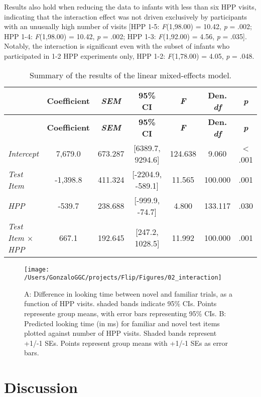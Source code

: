 \documentclass[english,man,man,floatsintext]{apa6}
\begin{document}
Results also hold when reducing the data to infants with less than six HPP visits, indicating that the interaction effect was not driven exclusively by participants with an unusually high number of visits {[}HPP 1-5: \emph{F}(1,98.00) = 10.42, \emph{p} = .002; HPP 1-4: \emph{F}(1,98.00) = 10.42, \emph{p} = .002; HPP 1-3: \emph{F}(1,92.00) = 4.56, \emph{p} = .035{]}. Notably, the interaction is significant even with the subset of infants who participated in 1-2 HPP experiments only, HPP 1-2: \emph{F}(1,78.00) = 4.05, \emph{p} = .048.

\begin{longtable}[]{@{}lcccccc@{}}
\caption{\label{tab:tab1}Summary of the results of the linear mixed-effects model.}\tabularnewline
\toprule
& \textbf{Coefficient} & \textbf{\emph{SEM}} & \textbf{95\% CI} & \textbf{\emph{F}} & \textbf{Den. \emph{df}} & \textbf{\emph{p}}\tabularnewline
\midrule
\endfirsthead
\toprule
& \textbf{Coefficient} & \textbf{\emph{SEM}} & \textbf{95\% CI} & \textbf{\emph{F}} & \textbf{Den. \emph{df}} & \textbf{\emph{p}}\tabularnewline
\midrule
\endhead
\emph{Intercept} & 7,679.0 & 673.287 & {[}6389.7, 9294.6{]} & 124.638 & 9.060 & \textless{} .001\tabularnewline
\emph{Test Item} & -1,398.8 & 411.324 & {[}-2204.9, -589.1{]} & 11.565 & 100.000 & .001\tabularnewline
\emph{HPP} & -539.7 & 238.688 & {[}-999.9, -74.7{]} & 4.800 & 133.117 & .030\tabularnewline
\emph{Test Item \(\times\) HPP} & 667.1 & 192.645 & {[}247.2, 1028.5{]} & 11.992 & 100.000 & .001\tabularnewline
\bottomrule
\end{longtable}

\begin{figure}
\texttt{[image: /Users/GonzaloGGC/projects/Flip/Figures/02\_interaction]} \caption{A: Difference in looking time between novel and familiar trials, as a function of HPP visits. shaded bands indicate 95\% CIs. Points represente group means, with error bars representing 95\% CIs. B: Predicted looking time (in ms) for familiar and novel test items plotted against number of HPP visits. Shaded bands represent +1/-1 SEs. Points represent group means with +1/-1 SEs as error bars.}\label{fig:fig2}
\end{figure}

\hypertarget{discussion}{%
\section{Discussion}\label{discussion}}
\end{document}

